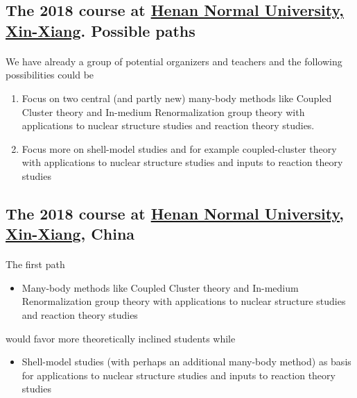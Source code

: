 \documentclass[%
oneside,                 %
final,                   %
10pt]{article}
\begin{document}
\noindent




\subsection*{The 2018 course at \href{{http://www.htu.cn/english/}}{Henan Normal University, Xin-Xiang}. Possible paths}

\paragraph{}
We have already a group of potential organizers and teachers and the following possibilities could be
\begin{enumerate}
\item Focus on two central (and partly new) many-body methods like Coupled Cluster theory and In-medium Renormalization group theory with applications to nuclear structure studies and reaction theory studies.

\item Focus more on shell-model studies and for example coupled-cluster theory with applications to nuclear structure studies and inputs to reaction theory studies
\end{enumerate}

\noindent







\subsection*{The 2018 course at \href{{http://www.htu.cn/english/}}{Henan Normal University, Xin-Xiang}, China}

\paragraph{}
The first path
\begin{itemize}
\item Many-body methods like Coupled Cluster theory and In-medium Renormalization group theory with applications to nuclear structure studies and reaction theory studies
\end{itemize}

\noindent
would favor more theoretically inclined students while
\begin{itemize}
\item Shell-model studies (with perhaps an additional many-body method) as basis for applications to nuclear structure studies and inputs to reaction theory studies
\end{itemize}
\end{document}

